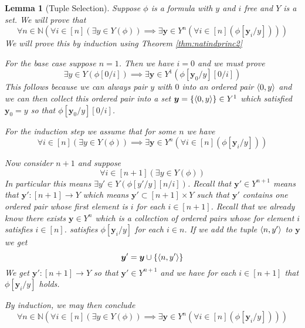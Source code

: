 \documentclass[12pt]{article}
\theoremstyle{break}
\theoremstyle{break}
\theoremstyle{break}
\theoremstyle{break}
\newtheorem{lemma}[theorem]{Lemma}
\theoremstyle{break}
\newtheorem{informal definition}[definition]{Informal Definition}
\newcommand{\bv}[1]{\boldsymbol{#1}}
\begin{document}
\begin{lemma}[Tuple Selection]
\label{lem:tupleselection}
Suppose $\phi$ is a formula with $y$ and $i$ free and $Y$ is a set.
We will prove that
$$
\forall n\in \mathbb{N}(\forall i \in[n] (\exists y \in Y(\phi))\implies \exists \bv{y}\in Y^n (\forall i \in [n](\phi[\bv{y}_i/y])))
$$
We will prove this by induction using Theorem \ref{thm:natindprinc2}

For the base case suppose $n=1$.
Then we have $i=0$ and we must prove
$$
\exists y \in Y(\phi[0/i]) \implies \exists \bv{y}\in Y^1(\phi[\bv{y}_0/y][0/i])
$$
This follows because we can always pair $y$ with $0$ into an ordered pair $\braket{0, y}$ and we can then collect this ordered pair into a set $\bv{y} = \{\braket{0, y}\} \in Y^1$ which satisfied $\bv{y}_0 = y$ so that $\phi[\bv{y}_0/y][0/i]$.

For the induction step we assume that for some $n$ we have
$$
\forall i \in [n] (\exists y \in Y(\phi)) \implies \exists \bv{y}\in Y^n(\forall i \in [n] (\phi[\bv{y}_i/y]))
$$

Now consider $n+1$ and suppose
$$
\forall i \in [n+1] (\exists y \in Y (\phi))
$$
In particular this means $\exists y' \in Y (\phi[y'/y][n/i])$.
Recall that $\bv{y}' \in Y^{n+1}$ means that $\bv{y}': [n+1] \to Y$ which means $\bv{y}' \subset [n+1] \times Y$ such that $\bv{y}'$ contains one ordered pair whose first element is $i$ for each $i \in [n+1]$.
Recall that we already know there exists $\bv{y}\in Y^n$ which is a collection of ordered pairs whose for element $i$ satisfies $i\in [n]$. satisfies $\phi[\bv{y}_i/y]$ for each $i\in n$.
If we add the tuple $\braket{n, y'}$ to $\bv{y}$ we get
$$
\bv{y}' = \bv{y} \cup \{\braket{n, y'}\}
$$
We get $\bv{y}': [n+1] \to Y$ so that $\bv{y}' \in Y^{n+1}$ and we have for each $i \in [n+1]$ that $\phi[\bv{y}_i/y]$ holds.

By induction, we may then conclude
$$
\forall n \in \mathbb{N}(\forall i \in [n](\exists y\in Y(\phi)) \implies \exists \bv{y}\in Y^n(\forall i \in [n](\phi[\bv{y}_i/y])))
$$
\end{lemma}
\end{document}
